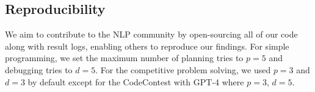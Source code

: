 \subsection{Reproducibility}
We aim to contribute to the NLP community by open-sourcing all of our code along with result logs, enabling others to reproduce our findings. For simple programming, we set the maximum number of planning tries to $p = 5$ and debugging tries to $d = 5$. For the competitive problem solving, we used $p = 3$ and $d = 3$ by default except for the CodeContest with GPT-4 where $p = 3$, $d = 5$.  


